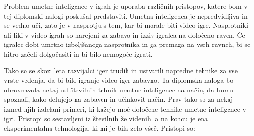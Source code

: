 \documentclass[a4paper, 12pt]{book}
\begin{document}
Problem umetne inteligence v igrah je uporaba različnih pristopov, katere bom v tej diplomski nalogi poskušal predstaviti. Umetna inteligenca je nepredvidljiva in se vedno uči, zato je v nasprotju s tem, kar bi morale biti video igre. Nasprotniki ali liki v video igrah so narejeni za zabavo in izziv igralca na določeno raven. Če igralec dobi umetno izboljšanega nasprotnika in ga premaga na vseh ravneh, bi se hitro začeli dolgočasiti in bi bilo nemogoče igrati.

Tako so se skozi leta razvijalci iger trudili in ustvarili napredne tehnike za vse vrste vedenja, da bi bilo igranje video iger zabavno. Ta diplomska naloga bo obravnavala nekaj od številnih tehnik umetne inteligence na način, da bomo spoznali, kako delujejo na zabaven in učinkovit način. Prav tako so za nekaj izmed njih izdelani primeri, ki kažejo moč določene tehnike umetne inteligence v igri. Pristopi so sestavljeni iz številnih že videnih, a na koncu je ena eksperimentalna tehnologija, ki mi je bila zelo všeč. Pristopi so:
\end{document}

